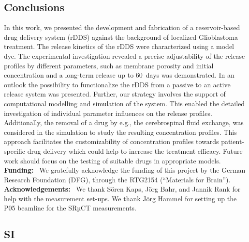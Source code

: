 \subsection{Conclusions}
In this work, we presented the development and fabrication of a reservoir-based drug delivery system (rDDS) against the background of localized Glioblastoma treatment. The release kinetics of the rDDS were characterized using a model dye. The experimental investigation revealed a precise adjustability of the release profiles by different parameters, such as membrane porosity and initial concentration and a long-term release up to 60~days was demonstrated. In an outlook the possibility to functionalize the rDDS from a passive to an active release system was presented. Further, our strategy involves the support of computational modelling and simulation of the system. This enabled the detailed investigation of individual parameter influences on the release profiles. Additionally, the removal of a drug by e.g., the cerebrospinal fluid exchange, was considered in the simulation to study the resulting concentration profiles. This approach facilitates the customizability of concentration profiles towards patient-specific drug delivery which could help to increase the treatment efficacy. Future work should focus on the testing of suitable drugs in appropriate models. \\

\textbf{Funding: }~We gratefully acknowledge the funding of this project by the German Research Foundation (DFG), through the RTG2154 (“Materials for Brain”). \\

\textbf{Acknowledgements: }~We thank Sören Kaps, Jörg Bahr, and Jannik Rank for help with the measurement set-ups. We thank Jörg Hammel for setting up the P05 beamline for the SRµCT measurements.

\subsection{SI}